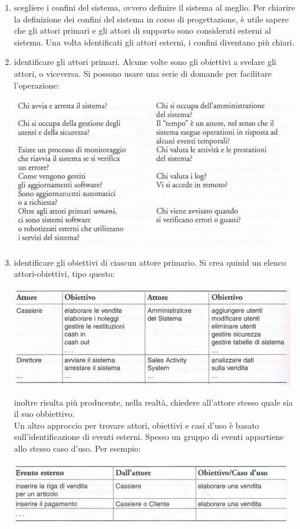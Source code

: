 \documentclass[a4paper,12pt, oneside]{book}
\begin{document}
\begin{enumerate}
	\item scegliere i confini del sistema, ovvero definire il sistema al meglio. Per chiarire la definizione dei confini del sistema in corso di progettazione, è utile sapere che gli attori primari e gli attori di supporto sono considerati esterni al sistema. Una volta identificati gli attori esterni, i confini diventano più chiari.
	\item identificare gli attori primari. Alcune volte sono gli obiettivi a svelare gli attori, o viceversa. Si possono usare una serie di domande per facilitare l'operazione:
	\begin{center}
		\includegraphics[scale=0.7]{img/dom.png}
	\end{center}
	\item identificare gli obiettivi di ciascun attore primario. Si crea quinid un elenco attori-obiettivi, tipo questo:
	\begin{center}
		\includegraphics[scale=0.7]{img/atob.png}
	\end{center}
	inoltre risulta più producente, nella realtà, chiedere all'attore stesso quale sia il suo obbiettivo. \\
	Un altro approccio per trovare attori, obiettivi e casi d'uso è basato sull'identificazione di eventi esterni. Spesso un gruppo di eventi appartiene allo stesso caso d'uso. Per esempio:
	\begin{center}
	\includegraphics[scale=0.7]{img/atob2.png}

\end{center}
\end{enumerate}
\end{document}
